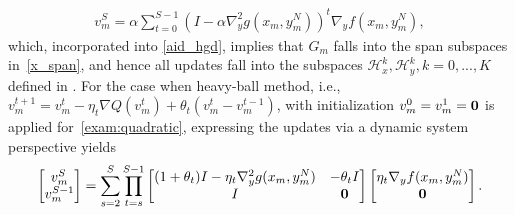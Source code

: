 \documentclass{osudissert96}
\begin{document}
\begin{align*}
v_m^{S} = \alpha \sum_{t=0}^{S-1}(I-\alpha\nabla_y^2g(x_m,y_m^N))^{t} \nabla_yf(x_m,y_m^N),
\end{align*}
which, incorporated into \cref{aid_hgd}, implies that $G_m$ falls into the span subspaces in~\cref{x_span}, and hence all updates fall into the subspaces $\mathcal{H}_x^k, \mathcal{H}_y^k, k=0,...,K$ defined in . For the case when heavy-ball method, i.e., $v_m^{t+1} = v_m^t-\eta_t \nabla Q(v_m^t) +\theta_t(v_m^t-v_m^{t-1})$, with initialization $v_m^0=v_m^1=\bf{0}$ is applied for~\cref{exam:quadratic}, expressing the updates via a dynamic system perspective yields 
\begin{align}\label{vmt_form} 
\begin{bmatrix}
v_m^{S}\\v_m^{S-1} 
\end{bmatrix}
= 
\sum_{s=2}^{S}\prod_{t=s}^{S-1}
\begin{bmatrix}
(1+\theta_t) I- \eta_t \nabla_y^2 g(x_m,y_m^N) & -\theta_t I\\I & \bf{0}
\end{bmatrix}
 \begin{bmatrix}
\eta_t \nabla_y f(x_m,y_m^N)\\\bf{0} 
\end{bmatrix}.
\end{align}

\end{document}
